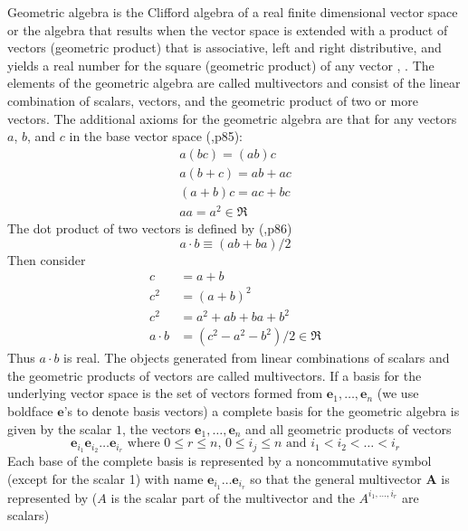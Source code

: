 \documentclass[12pt,twoside,openright]{memoir}
\newcommand{\bm}[1]{\boldsymbol{#1}}
\newcommand{\lp}{\left (}
\newcommand{\rp}{\right )}
\newcommand{\eb}{\bm{e}}
\begin{document}
Geometric algebra is the Clifford algebra of a real finite dimensional vector
space or the algebra that results when the vector space
is extended with a product of vectors (geometric product) that is associative,
left and right distributive, and yields a real number for the square (geometric
product) of any vector \cite{Hestenes}, \cite{Doran}.  The elements of the geometric
algebra are called multivectors and consist of the linear combination of
scalars, vectors, and the geometric product of two or more vectors. The
additional axioms for the geometric algebra are that for any vectors $a$,
$b$, and $c$ in the base vector space (\cite{Doran},p85):
  \begin{equation}
  \begin{array}{c}
  a\lp bc \rp = \lp ab \rp c \\
  a\lp b+c \rp = ab+ac \\
  \lp a + b \rp c = ac+bc \\
  aa = a^{2} \in \Re
  \end{array}
  \end{equation}
The dot product of two vectors is defined by (\cite{Doran},p86)
  \begin{equation}
     a\cdot b \equiv (ab+ba)/2
  \end{equation}
Then consider
  \begin{align}
     c &= a+b \\
     c^{2} &= (a+b)^{2} \\
     c^{2} &= a^{2}+ab+ba+b^{2} \\
     a\cdot b &= (c^{2}-a^{2}-b^{2})/2 \in \Re
  \end{align}
Thus $a\cdot b$  is real.  The objects generated from linear combinations of scalars and
the geometric products of vectors are called multivectors.  If a basis for
the underlying vector space is the set of vectors formed from $\eb_{1},\dots,\eb_{n}$ (we use
boldface $\eb$'s to denote basis vectors)
a complete basis for the geometric algebra is given by the scalar $1$, the vectors $\eb_{1},\dots,\eb_{n}$
and all geometric products of vectors
   \begin{equation}
      \eb_{i_{1}}\eb_{i_{2}}\dots \eb_{i_{r}} \mbox{ where } 0\le r \le n\mbox{, }0 \le i_{j} \le n \mbox{ and } i_{1}<i_{2}<\dots<i_{r}
   \end{equation}
Each base of the complete basis is represented by a noncommutative symbol (except for the scalar 1)
with name $\eb_{i_{1}}\dots \eb_{i_{r}}$ so that the general multivector $\bm{A}$ is represented by
($A$ is the scalar part of the multivector and the $A^{i_{1},\dots,i_{r}}$ are scalars)
\end{document}
